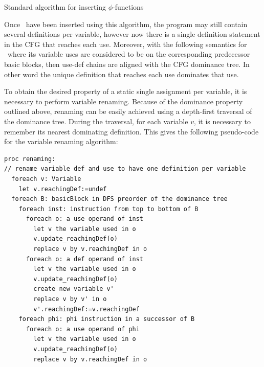 \begin{algorithm}
\caption{\label{alg:classical_construction:phi_insertion}Standard algorithm for inserting $\phi$-functions}
\end{algorithm}


Once \phiops\ have been inserted using this algorithm, the program may
still contain several definitions per variable, however now there is a
single definition statement 
in the CFG that reaches each use. Moreover, with the following semantics for \phiops\ where its variable uses are considered to be on the corresponding predecessor basic blocks, then use-def chains are aligned with the CFG dominance tree. In other word the unique definition that reaches each use dominates that use.

To obtain the desired property of a static single assignment per variable,
it is necessary to perform variable renaming.
Because of the dominance property outlined above,
renaming can be easily achieved using a depth-first traversal of the dominance tree.
During the traversal, for each variable $v$, it is necessary to remember its nearest dominating definition.
This gives the following pseudo-code for the variable renaming algorithm:

\begin{verbatim}
proc renaming:
// rename variable def and use to have one definition per variable
  foreach v: Variable
    let v.reachingDef:=undef
  foreach B: basicBlock in DFS preorder of the dominance tree
    foreach inst: instruction from top to bottom of B
      foreach o: a use operand of inst
        let v the variable used in o
        v.update_reachingDef(o)
        replace v by v.reachingDef in o
      foreach o: a def operand of inst
        let v the variable used in o
        v.update_reachingDef(o)
        create new variable v'
        replace v by v' in o
        v'.reachingDef:=v.reachingDef
    foreach phi: phi instruction in a successor of B
      foreach o: a use operand of phi
        let v the variable used in o
        v.update_reachingDef(o)
        replace v by v.reachingDef in o
\end{verbatim}

